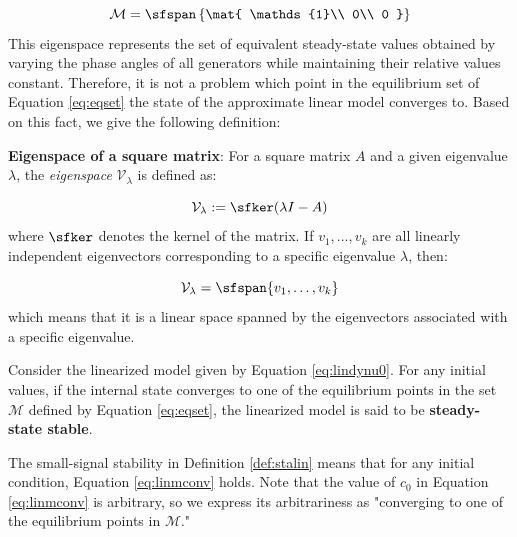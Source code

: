 \documentclass[graybox, envcountchap]{svmult}
\begin{document}
\begin{equation}\label{eq:eqset}
  \mathcal{M} =
  \sfspan\left\{
  \mat{
  \mathds{1}\\
  0\\
  0
  }
  \right\}
\end{equation}
This eigenspace represents the set of equivalent steady-state values obtained by
varying the phase angles of all generators while maintaining their relative
values constant. Therefore, it is not a problem which point in the equilibrium
set of Equation \ref{eq:eqset} the state of the approximate linear model
converges to. Based on this fact, we give the following definition:

\begin{COLUMN}
\noindent \textbf{Eigenspace of a square matrix}:
For a square matrix $A$ and a given eigenvalue $\lambda$, the \emph{eigenspace}
 $\mathcal{V}_{\lambda}$ is defined as:

\[
  \mathcal{V}_{\lambda}:= \sfker (\lambda I -A)
\]
where $\sfker$ denotes the kernel of the matrix. If $v_1,\ldots,v_k$ are all
linearly independent eigenvectors corresponding to a specific eigenvalue
$\lambda$, then:

\[
\mathcal{V}_{\lambda} = \sfspan\{v_1,\ldots,v_k\}
\]
which means that it is a linear space spanned by the eigenvectors associated
with a specific eigenvalue.

\end{COLUMN}


\begin{definition}
\label{def:stalin}

Consider the linearized model given by Equation \ref{eq:lindynu0}. For any
initial values, if the internal state converges to one of the equilibrium points
in the set $\mathcal{M}$ defined by Equation \ref{eq:eqset}, the linearized
model is said to be \textbf{steady-state stable}.
\end{definition}
The small-signal stability in Definition \ref{def:stalin} means that for any
initial condition, Equation \ref{eq:linmconv} holds. Note that the value of
$c_0$ in Equation \ref{eq:linmconv} is arbitrary, so we express its
arbitrariness as "converging to one of the equilibrium points in $\mathcal{M}$."
\end{document}
